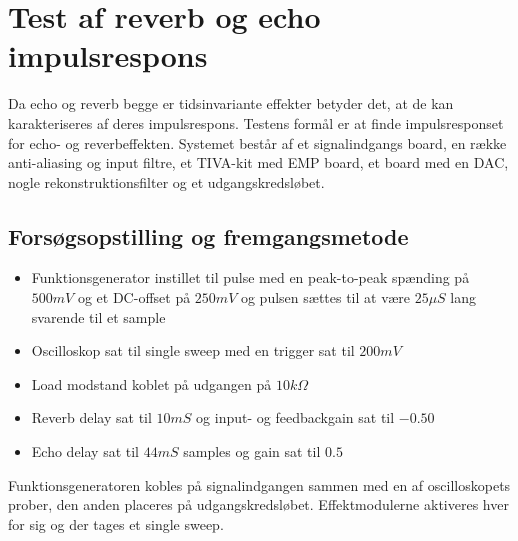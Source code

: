 \chapter{Test af reverb og echo impulsrespons}\label{sec:test_af_effekt}
Da echo og reverb begge er tidsinvariante effekter betyder det, at de kan karakteriseres af deres impulsrespons.\newline
Testens formål er at finde impulsresponset for echo- og reverbeffekten.
Systemet består af et signalindgangs board, en række anti-aliasing og input filtre, et TIVA-kit med EMP board, et board med en DAC, nogle rekonstruktionsfilter og et udgangskredsløbet.
\section{Forsøgsopstilling og fremgangsmetode}
\begin{itemize}
	\item Funktionsgenerator instillet til pulse med en peak-to-peak spænding på $500\si{mV}$ og et DC-offset på $250\si{mV}$ og pulsen sættes til at være $25\si{\mu S}$ lang svarende til et sample
	\item Oscilloskop sat til single sweep med en trigger sat til $200\si{mV}$
	\item Load modstand koblet på udgangen på $10\si{k\Omega}$
	\item Reverb delay sat til $10\si{mS}$ og input- og feedbackgain sat til $-0.50$
	\item Echo delay sat til $44\si{mS}$ samples og gain sat til $0.5$
\end{itemize}
Funktionsgeneratoren kobles på signalindgangen sammen med en af oscilloskopets prober, den anden placeres på udgangskredsløbet.\newline
Effektmodulerne aktiveres hver for sig og der tages et single sweep.
